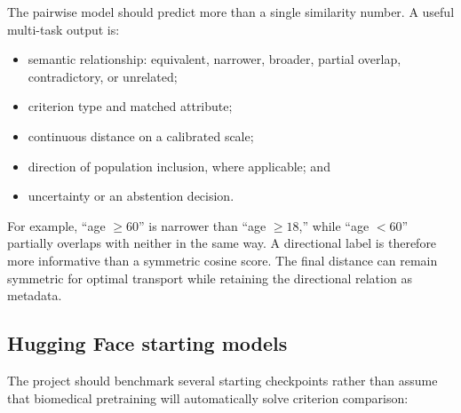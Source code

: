 \documentclass[11pt]{article}
\begin{document}
The pairwise model should predict more than a single similarity number. A useful multi-task output is:

\begin{itemize}
    \item semantic relationship: equivalent, narrower, broader, partial overlap, contradictory, or unrelated;
    \item criterion type and matched attribute;
    \item continuous distance on a calibrated scale;
    \item direction of population inclusion, where applicable; and
    \item uncertainty or an abstention decision.
\end{itemize}

For example, ``age $\geq 60$'' is narrower than ``age $\geq 18$,'' while ``age $<60$'' partially overlaps with neither in the same way. A directional label is therefore more informative than a symmetric cosine score. The final distance can remain symmetric for optimal transport while retaining the directional relation as metadata.

\subsection*{Hugging Face starting models}

The project should benchmark several starting checkpoints rather than assume that biomedical pretraining will automatically solve criterion comparison:
\end{document}
